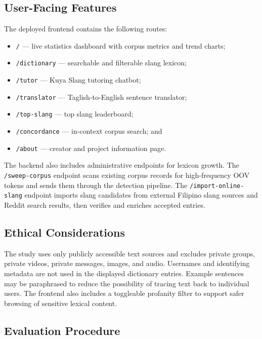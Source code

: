 \subsection{User-Facing Features}

The deployed frontend contains the following routes:

\begin{itemize}
    \item \texttt{/} --- live statistics dashboard with corpus metrics and trend charts;
    \item \texttt{/dictionary} --- searchable and filterable slang lexicon;
    \item \texttt{/tutor} --- Kuya Slang tutoring chatbot;
    \item \texttt{/translator} --- Taglish-to-English sentence translator;
    \item \texttt{/top-slang} --- top slang leaderboard;
    \item \texttt{/concordance} --- in-context corpus search; and
    \item \texttt{/about} --- creator and project information page.
\end{itemize}

The backend also includes administrative endpoints for lexicon growth. The \texttt{/sweep-corpus} endpoint scans existing corpus records for high-frequency OOV tokens and sends them through the detection pipeline. The \texttt{/import-online-slang} endpoint imports slang candidates from external Filipino slang sources and Reddit search results, then verifies and enriches accepted entries.

\subsection{Ethical Considerations}

The study uses only publicly accessible text sources and excludes private groups, private videos, private messages, images, and audio. Usernames and identifying metadata are not used in the displayed dictionary entries. Example sentences may be paraphrased to reduce the possibility of tracing text back to individual users. The frontend also includes a toggleable profanity filter to support safer browsing of sensitive lexical content.

\subsection{Evaluation Procedure}

